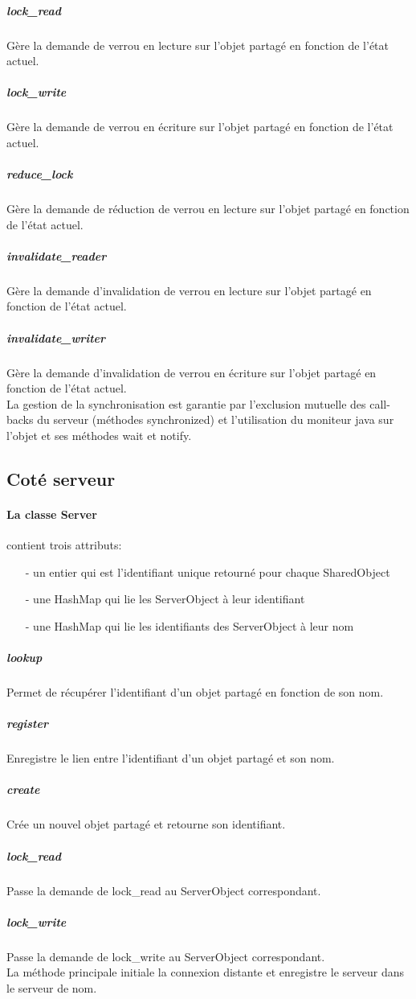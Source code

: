 \documentclass[a4paper,12pt]{article}
\begin{document}
\subparagraph{lock\_read}
Gère la demande de verrou en lecture sur l'objet partagé en fonction de l'état actuel.
\subparagraph{lock\_write}
Gère la demande de verrou en écriture sur l'objet partagé en fonction de l'état actuel.
\subparagraph{reduce\_lock}
Gère la demande de réduction de verrou en lecture sur l'objet partagé en fonction de l'état actuel.
\subparagraph{invalidate\_reader}
Gère la demande d'invalidation de verrou en lecture sur l'objet partagé en fonction de l'état actuel.
\subparagraph{invalidate\_writer}
Gère la demande d'invalidation de verrou en écriture sur l'objet partagé en fonction de l'état actuel.\\

La gestion de la synchronisation est garantie par l'exclusion mutuelle des call-backs du serveur (méthodes synchronized) et l'utilisation du moniteur java sur l'objet et ses méthodes wait et notify.


\bigskip
\bigskip

\subsection{Coté serveur}

\bigskip

\paragraph{La classe Server}

contient trois attributs:
\begin{itemize}
\item[- un entier qui est l'identifiant unique retourné pour chaque SharedObject]
\item[- une HashMap qui lie les ServerObject à leur identifiant]
\item[- une HashMap qui lie les identifiants des ServerObject à leur nom]
\end{itemize}

\smallskip
\subparagraph{lookup}
Permet de récupérer l'identifiant d'un objet partagé en fonction de son nom.
\subparagraph{register}
Enregistre le lien entre l'identifiant d'un objet partagé et son nom.
\subparagraph{create}
Crée un nouvel objet partagé et retourne son identifiant.
\subparagraph{lock\_read}
Passe la demande de lock\_read au ServerObject correspondant.
\subparagraph{lock\_write}
Passe la demande de lock\_write au ServerObject correspondant.\\

La méthode principale initiale la connexion distante et enregistre le serveur dans le serveur de nom.
\end{document}
